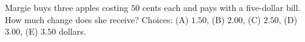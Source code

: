 Margie buys three apples costing $50$ cents each and pays with a five-dollar bill. How much change does she receive? Choices: (A) $1.50$, (B) $2.00$, (C) $2.50$, (D) $3.00$, (E) $3.50$ dollars.
